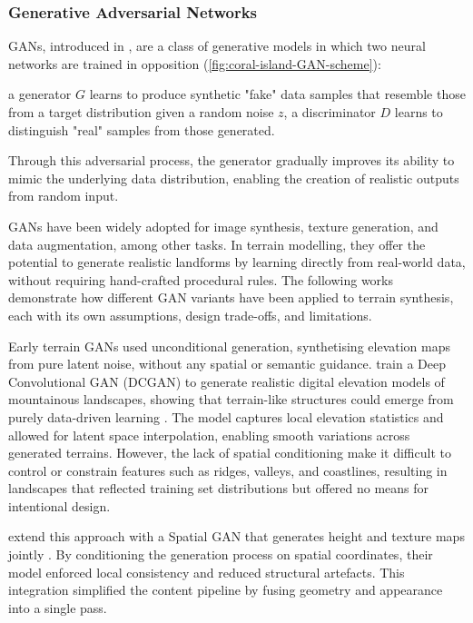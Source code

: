 \subsubsection{Generative Adversarial Networks}
\label{sec:coral-island-sota-GAN}

GANs, introduced in \cite{Goodfellow2014}, are a class of generative models in which two neural networks are trained in opposition (\cref{fig:coral-island-GAN-scheme}): 
\begin{Itemize}
    \Item{} a generator $G$ learns to produce synthetic "fake" data samples that resemble those from a target distribution given a random noise $z$, 
    \Item{} a discriminator $D$ learns to distinguish "real" samples from those generated. 
\end{Itemize}

Through this adversarial process, the generator gradually improves its ability to mimic the underlying data distribution, enabling the creation of realistic outputs from random input.

GANs have been widely adopted for image synthesis, texture generation, and data augmentation, among other tasks. In terrain modelling, they offer the potential to generate realistic landforms by learning directly from real-world data, without requiring hand-crafted procedural rules. The following works demonstrate how different GAN variants have been applied to terrain synthesis, each with its own assumptions, design trade-offs, and limitations.

Early terrain GANs used unconditional generation, synthetising elevation maps from pure latent noise, without any spatial or semantic guidance.  train a Deep Convolutional GAN (DCGAN) to generate realistic digital elevation models of mountainous landscapes, showing that terrain-like structures could emerge from purely data-driven learning \cite{WulffJensen2018}. The model captures local elevation statistics and allowed for latent space interpolation, enabling smooth variations across generated terrains. However, the lack of spatial conditioning make it difficult to control or constrain features such as ridges, valleys, and coastlines, resulting in landscapes that reflected training set distributions but offered no means for intentional design.

 extend this approach with a Spatial GAN that generates height and texture maps jointly \cite{Spick2019}. By conditioning the generation process on spatial coordinates, their model enforced local consistency and reduced structural artefacts. This integration simplified the content pipeline by fusing geometry and appearance into a single pass. 

